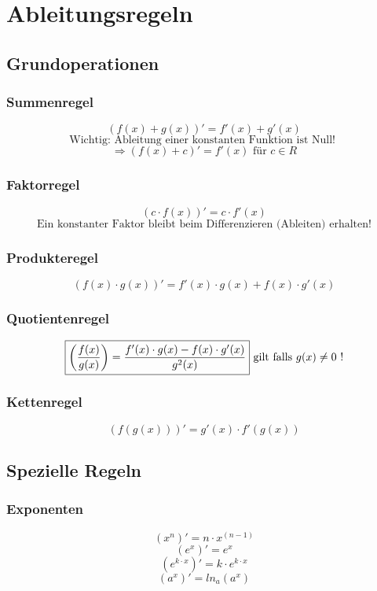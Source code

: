 \section{Ableitungsregeln}

\subsection{Grundoperationen}

\subsubsection{Summenregel}
\[ \boxed{ (f(x) + g(x))' = f'(x) + g'(x) } \]
\[ \text{Wichtig: Ableitung einer konstanten Funktion ist Null! } \]
\[ \Rightarrow (f(x) + c)' = f'(x) \text{ für } c \in R \]

\subsubsection{Faktorregel}
\[ \boxed{ (c \cdot f(x))' = c \cdot f'(x) } \]
\[ \text{Ein konstanter Faktor bleibt beim Differenzieren (Ableiten) erhalten!} \]

\subsubsection{Produkteregel}
\[ \boxed{ (f(x) \cdot g(x))' = f'(x) \cdot g(x) + f(x) \cdot g'(x) } \]

\subsubsection{Quotientenregel}
\[ \boxed{ \left( \frac{f(x)}{g(x)} \right) = \frac{ f'(x) \cdot g(x) - f(x) \cdot g'(x) }{ g^2(x) } } \\ \text{ gilt falls }g(x) \neq 0 \text{ !} \]

\subsubsection{Kettenregel}
\[ \boxed{ (f(g(x)))' = g'(x) \cdot f'(g(x)) } \]

\newpage

\subsection{Spezielle Regeln}

\subsubsection{Exponenten}
\[ \boxed{ (x^n)' = n\cdot x^{(n-1)} } \]
\[ \boxed{ (e^x)' = e^x } \]
\[ \boxed{ (e^{k\cdot x})' = k \cdot e^{k\cdot x} } \]
\[ \boxed{ (a^x)' = ln_a (a^x) } \]

